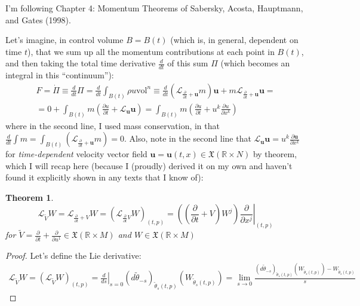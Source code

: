 \documentclass[twoside,landscape,10pt]{amsart}
\theoremstyle{plain}
\newtheorem{theorem}{Theorem}
\theoremstyle{definition}
\theoremstyle{remark}
\theoremstyle{remark}
\begin{document}
\begin{multicols*}{2}
I'm following Chapter 4: Momentum Theorems of Sabersky, Acosta, Hauptmann, and Gates (1998)\cite{SAHG1998}.  

Let's imagine, in control volume $B=B(t)$ (which is, in general, dependent on time $t$), that we sum up all the momentum contributions at each point in $B(t)$, and then taking the total time derivative $\frac{d}{dt}$ of this sum $\Pi$ (which becomes an integral in this ``continuum''):
\begin{equation}\label{Eq:F=ma}
\begin{gathered}
  F = \dot{\Pi} \equiv \frac{d}{dt} \Pi = \frac{d}{dt} \int_{B(t)} \rho u \text{vol}^n \equiv \frac{d}{dt} ( \mathcal{L}_{\frac{ \partial }{ \partial t} + \mathbf{u} } m ) \mathbf{u} + m \mathcal{L}_{ \frac{ \partial }{ \partial t} + \mathbf{u} } \mathbf{u} = \\
  = 0 + \int_{B(t)} m \left( \frac{ \partial u}{ \partial t} + \mathcal{L}_{\mathbf{u}} \mathbf{u}  \right) = \int_{B(t)} m \left( \frac{ \partial u }{ \partial t} + u^k \frac{ \partial u}{ \partial x^k} \right)
\end{gathered}
\end{equation}
where in the second line, I used mass conservation, in that $\frac{d}{dt} \int m = \int_{B(t)} \left( \mathcal{L}_{ \frac{ \partial }{ \partial t} + \mathbf{u} } m \right) = 0$.  Also, note in the second line that $\mathcal{L}_{\mathbf{u}} \mathbf{u} = u^k \frac{ \partial \mathbf{u}}{ \partial x^k}$ for \emph{time-dependent} velocity vector field $\mathbf{u} = \mathbf{u}(t,x) \in \mathfrak{X}(\mathbb{R} \times N)$ by theorem, which I will recap here (because I (proudly) derived it on my own and haven't found it explicitly shown in any texts that I know of):  

\begin{theorem}
\begin{equation}
\mathcal{L}_{\widetilde{V}}W = \mathcal{L}_{ \frac{ \partial }{ \partial t} +V}W = \left( \mathcal{L}_{ \frac{ \partial}{ \partial t} V } W \right)_{(t,p)} = \left( \left( \frac{ \partial }{ \partial t} + V \right) W^j \right) \left. \frac{ \partial }{ \partial x^j} \right|_{(t,p)}
\end{equation}
for $\widetilde{V} = \frac{ \partial }{ \partial t} + \frac{ \partial }{ \partial u^1} \in \mathfrak{X}(\mathbb{R} \times M)$  and $W \in \mathfrak{X}(\mathbb{R} \times M)$
\end{theorem}

\begin{proof}
Let's define the Lie derivative:
\begin{equation}
\begin{gathered}
  \mathcal{L}_{\widetilde{V}}W = (\mathcal{L}_{\widetilde{V}}W)_{(t,p)} = \left. \frac{d}{ds} \right|_{s=0}(d\widetilde{\theta}_{-s})_{\widetilde{\theta}_s(t,p)}(W_{\widetilde{\theta}_s(t,p)})   = \lim_{s\to 0} \frac{ (d\widetilde{\theta}_{-s})_{\widetilde{\theta}_s(t,p)}( W_{\widetilde{\theta}_s(t,p)}) - W_{\widetilde{\theta}_s(t,p)} }{s}
\end{gathered}
\end{equation}



\end{proof}
\end{multicols*}
\end{document}
